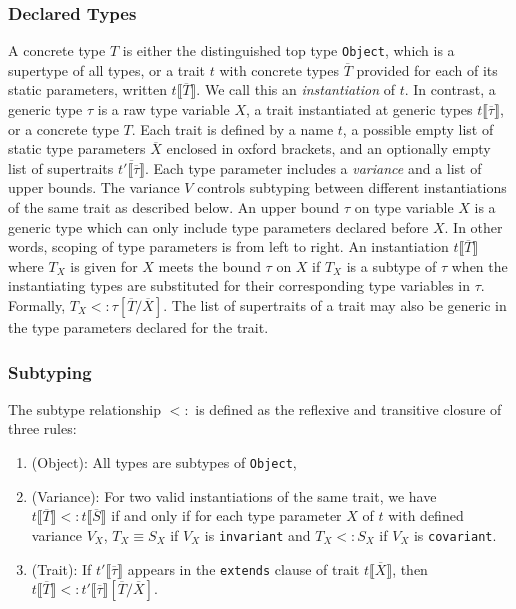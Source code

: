 \documentclass[preprint]{sigplanconf}
\newcommand{\obb}[1]{\ensuremath{\llbracket \overline{#1} \rrbracket}}
\begin{document}
\subsubsection{Declared Types}

A concrete type $T$ is either the distinguished top type {\tt Object}, which is a supertype of all types, or a trait $t$
with concrete types $\overline{T}$ provided for each of its static parameters, written $t\obb{T}$.  We call this
an {\it instantiation} of $t$.  In contrast, a generic type $\tau$ is a raw type variable $X$, a trait instantiated
at generic types $t\obb{\tau}$, or a concrete type $T$.  Each trait is defined by a name $t$, a possible empty list of static 
type parameters $\overline{X}$ enclosed in oxford brackets, and an optionally empty list of supertraits $\overline{t'\obb{\tau}}$. 
Each type parameter includes a {\it variance} and a list of upper bounds.  The variance $V$ controls subtyping between
different instantiations of the same trait as described below.  An upper bound $\tau$ on type variable $X$ is a generic type 
which can only include type parameters declared before $X$.  In other words, scoping of type parameters is from
left to right.  An instantiation $t\obb{T}$ where $T_X$ is given for $X$ meets the bound $\tau$ on $X$ if $T_X$ is a subtype
of $\tau$ when the instantiating types are substituted for their corresponding type variables in $\tau$.  Formally, 
$T_X <: \tau[\overline{T}/\overline{X}]$.  The list of supertraits of a trait may also be generic in the type parameters
declared for the trait.

\subsubsection{Subtyping}

The subtype relationship $<:$ is defined as the reflexive and transitive closure of three rules:
\begin{enumerate}
\item (Object): All types are subtypes of {\tt Object},
\item (Variance): For two valid instantiations of the same trait, we have $t\obb{T} <: t\obb{S}$ if and only if for each type parameter
	$X$ of $t$ with defined variance $V_X$, $T_X \equiv S_X$ if $V_X$ is {\tt invariant} and $T_X <: S_X$ if
	$V_X$ is {\tt covariant}.
\item (Trait): If $t'\obb{\tau}$ appears in the {\tt extends} clause of trait $t\obb{X}$, 
	then $t\obb{T} <: t'\obb{\tau}[\overline{T}/\overline{X}]$.
\end{enumerate}
\end{document}

